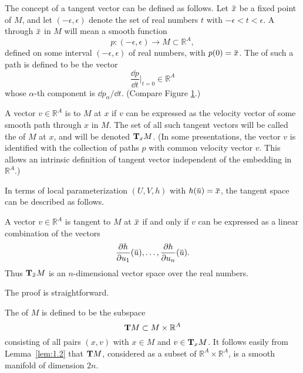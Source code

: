 \documentclass[../main]{subfiles}
\begin{document}
The concept of a tangent vector can be defined as follows. Let $\xoverline x$ be a fixed point of $M$, and let $(-\epsilon, \epsilon)$ denote the set of real numbers $t$ with $-\epsilon < t < \epsilon$. A  through $\xoverline x$ in $M$ will mean a smooth function \[p : (-\epsilon, \epsilon) \longrightarrow M \subset {\mathbb R}^A,\] defined on some interval $(-\epsilon, \epsilon)$ of real numbers, with $p(0) = \xoverline x$. The  of such a path is defined to be the vector 
\[\dfrac{\dd p}{\dd t} \Big|_{t = 0} \in {\mathbb R}^A\] whose $\alpha$-th component is $\dd p_\alpha/\dd t$. (Compare Figure \ref{fig:figure1}.) 

\begin{definition}
A vector $v \in {\mathbb R}^A$ is  to $M$ at $x$ if $v$ can be expressed as the velocity vector of some smooth path through $x$ in $M$. The set of all such tangent vectors will be called the  of $M$ at $x$, and will be denoted $\tangentspace M x$. (In some presentations, the vector $v$ is identified with the collection of paths $p$ with common velocity vector $v$. This allows an intrinsic definition of tangent vector independent of the embedding in ${\mathbb R}^A$.)
\end{definition}




In terms of local parameterization $(U, V, h)$ with $h(\xoverline u) = \xoverline x$, the tangent space can be described as follows.
\begin{lemma}
\label{lem:1.2}
A vector $v \in {\mathbb R}^A$ is tangent to $M$ at $\xoverline x$ if and only if $v$ can be expressed as a linear combination of the vectors \[\frac {\partial h} {\partial u_1}(\xoverline u), \ldots, \frac {\partial h} {\partial u_n} (\xoverline u).\] Thus $\tangentspace M {\xoverline x}$ is an $n$-dimensional vector space over the real numbers. 
\end{lemma}

The proof is straightforward. 

\begin{figure}[ht]
    \centering
    \caption{}
    \label{fig:figure1}
\end{figure}
The  of $M$ is defined to be the subspace \[\tangentTS M \subset M \times {\mathbb R}^A\] consisting of all pairs $(x, v)$ with $x \in M$ and $v \in \tangentspace M x$. It follows easily from Lemma~\ref{lem:1.2} that $\tangentTS M$, considered as a subset of ${\mathbb R}^A \times {\mathbb R}^A$, is a smooth manifold of dimension $2 n$. 
\end{document}
